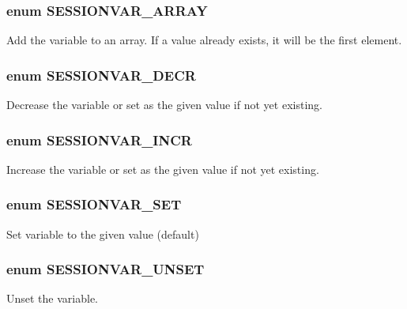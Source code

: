\subsubsection[{SESSIONVAR\_\-ARRAY}]{\setlength{\rightskip}{0pt plus 5cm}enum {\bf SESSIONVAR\_\-ARRAY}}\label{group__SESSION__VariableFlags_ga37ebf617beca75ce8d60f06b8c37423a}


Add the variable to an array. If a value already exists, it will be the first element. 

\subsubsection[{SESSIONVAR\_\-DECR}]{\setlength{\rightskip}{0pt plus 5cm}enum {\bf SESSIONVAR\_\-DECR}}\label{group__SESSION__VariableFlags_ga25d82db99af8d3372efbccb0917f33cb}


Decrease the variable or set as the given value if not yet existing. 

\subsubsection[{SESSIONVAR\_\-INCR}]{\setlength{\rightskip}{0pt plus 5cm}enum {\bf SESSIONVAR\_\-INCR}}\label{group__SESSION__VariableFlags_gacf42fdbedc1bd30daaebadb12f63c75c}


Increase the variable or set as the given value if not yet existing. 

\subsubsection[{SESSIONVAR\_\-SET}]{\setlength{\rightskip}{0pt plus 5cm}enum {\bf SESSIONVAR\_\-SET}}\label{group__SESSION__VariableFlags_gaf9e860b1663497a46177b0ec35d6a9f5}


Set variable to the given value (default) 

\subsubsection[{SESSIONVAR\_\-UNSET}]{\setlength{\rightskip}{0pt plus 5cm}enum {\bf SESSIONVAR\_\-UNSET}}\label{group__SESSION__VariableFlags_ga5ac16a9e50c48935c45ceae46ffdc598}


Unset the variable. 

